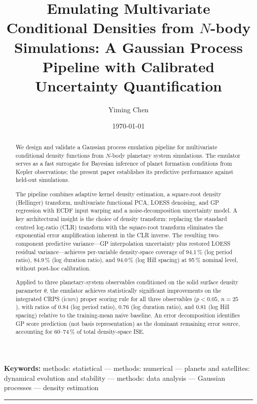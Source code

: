 \documentclass[12pt,a4paper]{article}
\title{\textbf{Emulating Multivariate Conditional Densities from
$N$-body Simulations: A Gaussian Process Pipeline with Calibrated
Uncertainty Quantification}}
\author[1]{Yiming Chen}
\affil[1]{Independent researcher, United States}
\date{\small\today}
\newcommand{\iCRPS}{i\textsc{crps}}
\newcommand{\spar}{\theta}
\begin{document}
\linenumbers
\maketitle
\thispagestyle{empty}

\begin{abstract}
\noindent
We design and validate a Gaussian process emulation pipeline for
multivariate conditional density functions from $N$-body planetary
system simulations.  The emulator serves as a fast surrogate for
Bayesian inference of planet formation conditions from Kepler
observations; the present paper establishes its predictive performance
against held-out simulations.

The pipeline combines adaptive kernel density estimation, a
square-root density (Hellinger) transform, multivariate functional
PCA, LOESS denoising, and GP regression with ECDF input warping and a
noise-decomposition uncertainty model.  A key architectural insight is
the choice of density transform: replacing the standard centred
log-ratio (CLR) transform with the square-root transform eliminates the
exponential error amplification inherent in the CLR inverse.  The
resulting two-component predictive variance---GP interpolation
uncertainty plus restored LOESS residual variance---achieves
per-variable density-space coverage of 94.1\,\% (log period ratio),
84.9\,\% (log duration ratio), and 94.0\,\% (log Hill spacing) at
95\,\% nominal level, without post-hoc calibration.

Applied to three planetary-system observables conditioned on the solid
surface density parameter $\spar$, the emulator achieves statistically
significant improvements on the integrated CRPS (\iCRPS) proper scoring
rule for all three observables ($p<0.05$, $n=25$), with ratios of 0.84
(log period ratio), 0.76 (log duration ratio), and 0.81 (log Hill
spacing) relative to the training-mean naive baseline.  An error decomposition
identifies GP score prediction (not basis representation) as the
dominant remaining error source, accounting for 60--74\,\% of total
density-space ISE.
\end{abstract}

\textbf{Keywords:} methods: statistical --- methods: numerical ---
planets and satellites: dynamical evolution and stability ---
methods: data analysis --- Gaussian processes --- density estimation

\vspace{0.5cm}\hrule\vspace{0.5cm}
\end{document}
